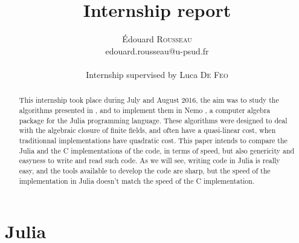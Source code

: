 \documentclass[a4paper,11pt]{article}
\title{Internship report}
\author{Édouard \textsc{Rousseau}\\edouard.rousseau@u-psud.fr\\ \\Internship 
supervised by Luca \textsc{De 
Feo}}
\theoremstyle{break}
\theoremstyle{definition}
\theoremstyle{remark}
\begin{document}
\maketitle

\begin{abstract}

  This internship took place during July and August 2016, the aim was to study
  the algorithms presented in \cite{DeDoSc14}, and to implement them in Nemo
  \cite{Nemo}, a computer algebra package for the Julia \cite{Julia} programming
  language. These algorithms were designed to deal with the algebraic closure 
  of finite fields, and often have a quasi-linear cost, when traditionnal 
  implementations have quadratic cost. This paper intends to compare the Julia 
  and the C implementations of the code, in terms of speed, but also genericity 
  and easyness to write and read such code. As we will see, writing code in 
  Julia is really easy, and the tools available to develop the code are 
  sharp, but the speed of the implementation in Julia doesn't match the speed 
  of the C implementation.

\end{abstract}

\tableofcontents

\clearpage

\section{Julia}
\end{document}

